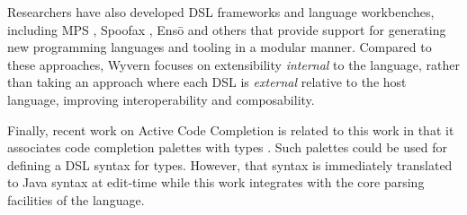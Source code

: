 Researchers have also developed DSL frameworks and language workbenches, including MPS \cite{mps}, Spoofax \cite{KatsVisser2010}, Ens\={o} \cite{enso} and others \cite{krahn2008monticore,van1992pregmatic} that provide support for generating new programming languages and tooling in a modular manner.  
Compared to these approaches, Wyvern focuses on extensibility \emph{internal} to the language, rather than taking an approach where each DSL is \emph{external} relative to the host language, improving interoperability and composability.

Finally, recent work on Active Code Completion is related to this work in that it associates code completion palettes with types \cite{omar2012active}. Such palettes could be used for defining a DSL syntax for types. However, that syntax is  immediately translated to Java syntax at edit-time while this work integrates with the core parsing facilities of the language.



